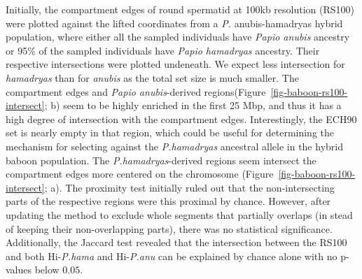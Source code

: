 \documentclass[
  11pt,
  a4paper,
]{scrbook}
\let\oldemph\emph
\renewcommand\emph[1]{\oldemph{\color{gray}#1}}
\begin{document}
Initially, the compartment edges of round spermatid at 100kb resolution
(RS100) were plotted against the lifted coordinates from a \emph{P.}
anubis-hamadryas hybrid population, where either all the sampled
individuals have \emph{Papio anubis} ancestry or 95\% of the sampled
individuals have \emph{Papio hamadryas} ancestry. Their respective
intersections were plotted undeneath. We expect less intersection for
\emph{hamadryas} than for \emph{anubis} as the total set size is much
smaller. The compartment edges and \emph{Papio anubis}-derived
regions(Figure~\ref{fig-baboon-rs100-intersect}; b) seem to be highly
enriched in the first 25 Mbp, and thus it has a high degree of
intersection with the compartment edges. Interestingly, the ECH90 set is
nearly empty in that region, which could be useful for determining the
mechanism for selecting against the \emph{P.hamadryas} ancestral allele
in the hybrid baboon population. The \emph{P.hamadryas}-derived regions
seem intersect the compartment edges more centered on the chromosome
(Figure~\ref{fig-baboon-rs100-intersect}; a). The proximity test
initially ruled out that the non-intersecting parts of the respective
regions were this proximal by chance. However, after updating the method
to exclude whole segments that partially overlaps (in stead of keeping
their non-overlapping parts), there was no statistical significance.
Additionally, the Jaccard test revealed that the intersection between
the RS100 and both Hi-\emph{P.hama} and Hi-\emph{P.anu} can be explained
by chance alone with no p-values below \(0.05\).
\end{document}
